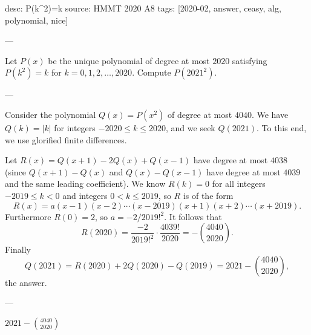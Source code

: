 desc: P(k^2)=k
source: HMMT 2020 A8
tags: [2020-02, answer, ceasy, alg, polynomial, nice]

---

Let $P(x)$ be the unique polynomial of degree at most $2020$ satisfying $P(k^2)=k$ for $k=0,1,2,\ldots,2020$. Compute $P(2021^2)$.

---

Consider the polynomial $Q(x)=P(x^2)$ of degree at most $4040$. We have $Q(k)=|k|$ for integers $-2020\le k\le2020$, and we seek $Q(2021)$. To this end, we use glorified finite differences.

Let $R(x)=Q(x+1)-2Q(x)+Q(x-1)$ have degree at most $4038$ (since $Q(x+1)-Q(x)$ and $Q(x)-Q(x-1)$ have degree at most $4039$ and the same leading coefficient). We know $R(k)=0$ for all integers $-2019\le k<0$ and integers $0<k\le2019$, so $R$ is of the form \[R(x)=a(x-1)(x-2)\cdots(x-2019)(x+1)(x+2)\cdots(x+2019).\]
Furthermore $R(0)=2$, so $a=-2/2019!^2$. It follows that \[R(2020)=\frac{-2}{2019!^2}\cdot\frac{4039!}{2020}=-\binom{4040}{2020}.\]
Finally \[Q(2021)=R(2020)+2Q(2020)-Q(2019)=2021-\binom{4040}{2020},\]
the answer.

---

$2021-\binom{4040}{2020}$
